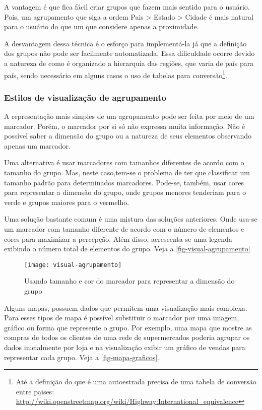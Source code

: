 			A vantagem é que fica fácil criar grupos que fazem mais sentido para o usuário. Pois, um agrupamento que siga a ordem Pais > Estado > Cidade é mais natural para o usuário do que um que considere apenas a proximidade.
			
			A desvantagem dessa técnica é o esforço para implementá-la  \cite[182]{livroGoogleApiV3} já que a definição dos grupos não pode ser facilmente automatizada. Essa dificuldade ocorre devido a natureza de como é organizado a hierarquia das regiões, que varia de país para país, sendo necessário em alguns casos o uso de tabelas para conversão\footnote{Até a definição do que é uma autoestrada precisa de uma tabela de conversão entre paises: \url{http://wiki.openstreetmap.org/wiki/Highway:International_equivalence}}.
			
		\subsubsection{Estilos de visualização de agrupamento}
		A representação mais simples de um agrupamento pode ser feita por meio de um marcador. Porém, o marcador por si só não expressa muita informação. Não é possível saber a dimensão do grupo ou a natureza de seus elementos observando apenas um marcador.
		
		Uma alternativa é usar marcadores com tamanhos diferentes de acordo com o tamanho do grupo. Mas, neste caso,tem-se o problema de ter que classificar um tamanho padrão para determinados marcadores. Pode-se, também, usar cores para representar a dimensão do grupo, onde grupos menores tenderiam para o verde e grupos maiores para o vermelho.
		
		Uma solução bastante comum é uma mistura das soluções anteriores. Onde usa-se um marcador com tamanho diferente de acordo com o número de elementos e cores para maximizar a percepção. Além disso, acrescenta-se uma legenda exibindo o número total de elementos do grupo. Veja a \autoref{fig-visual-agrupamento}
		
		
\begin{figure}[htb]
	\caption{\label{fig-visual-agrupamento}Usando tamanho e cor do marcador para representar a dimensão do grupo}
	\begin{center}
	    \texttt{[image: visual-agrupamento]}
	\end{center}
\end{figure}

	Alguns mapas, possuem dados que permitem uma visualização mais complexa. Para esses tipos de mapa é possível substituir o marcador por uma imagem, gráfico ou forma que represente o grupo.  Por exemplo, uma mapa que mostre as compras de todos os clientes de uma rede de supermercados poderia agrupar os dados inicialmente por loja e na visualização exibir um gráfico de vendas para representar cada grupo. Veja a \autoref{fig-mapa-graficos}.
	

